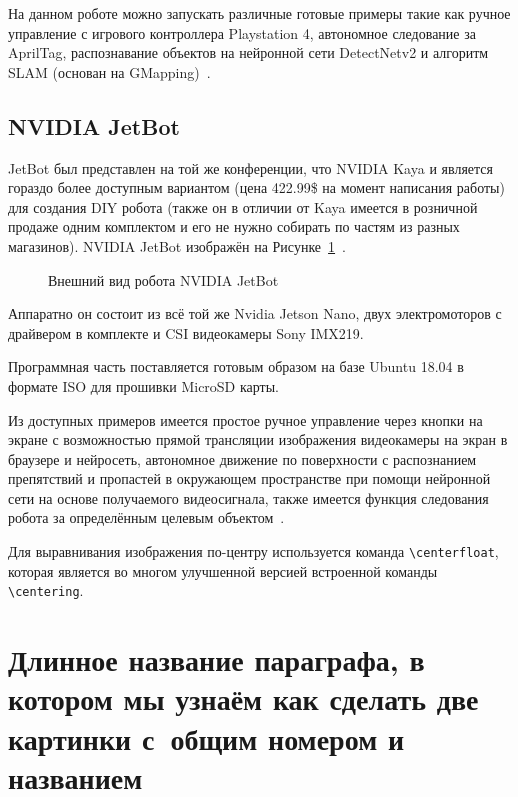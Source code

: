 На данном роботе можно запускать различные готовые примеры такие как ручное управление с игрового контроллера Playstation 4, автономное следование
за AprilTag, распознавание объектов на нейронной сети DetectNetv2 и алгоритм SLAM (основан на GMapping)~\cite{isaac-kaya}.

\subsection{NVIDIA JetBot}

JetBot был представлен на той же конференции, что NVIDIA Kaya и является гораздо более доступным вариантом (цена 422.99\$ на момент написания работы) для создания DIY робота (также он в отличии от Kaya имеется в розничной продаже одним комплектом и его не нужно собирать по частям из разных магазинов). NVIDIA JetBot изображён на Рисунке~\cref{fig:jetbot}~\cite{jetbot}.

\begin{figure}[ht]
    \caption{Внешний вид робота NVIDIA JetBot}\label{fig:jetbot}
\end{figure}

Аппаратно он состоит из всё той же Nvidia Jetson Nano, двух электромоторов с драйвером в комплекте и CSI видеокамеры Sony IMX219. 

Программная часть поставляется готовым образом на базе Ubuntu 18.04 в формате ISO для прошивки MicroSD карты.

Из доступных примеров имеется простое ручное управление через кнопки на экране с возможностью прямой трансляции изображения видеокамеры на экран в браузере и нейросеть, автономное движение по поверхности с распознанием препятствий и пропастей в окружающем пространстве при помощи нейронной сети на основе получаемого видеосигнала, также имеется функция следования робота за определённым целевым объектом~\cite{jetbot-examples}.

Для выравнивания изображения по-центру используется команда \verb+\centerfloat+, которая является во
многом улучшенной версией встроенной команды \verb+\centering+.

\section{Длинное название параграфа, в котором мы узнаём как сделать две картинки с~общим номером и названием}\label{sec:ch2/sect2}

